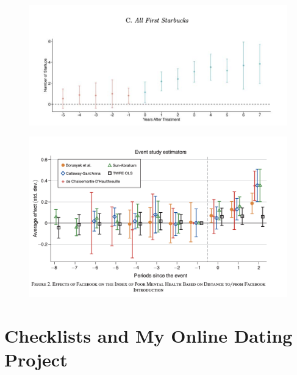\documentclass{beamer}
\begin{document}
\begin{frame}

\begin{figure}
    \centering
    \includegraphics[height=0.6\textheight]{./lecture_includes/magic_johnson_eventstudy}
\end{figure}

\end{frame}

\begin{frame}

\begin{figure}
    \centering
    \includegraphics[height=0.6\textheight]{./lecture_includes/facebook_3.png}
\end{figure}

\end{frame}





\section{Checklists and My Online Dating Project}
\end{document}
